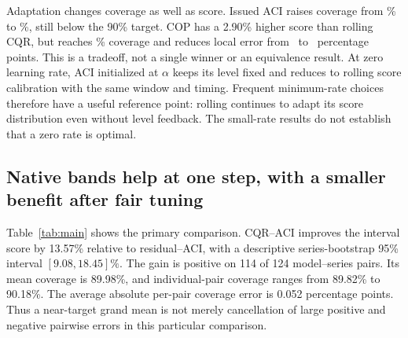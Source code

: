 \documentclass[preprint,11pt]{elsarticle}
\newcommand{\IS}{\operatorname{IS}}
\begin{document}
\begin{table}[!htbp]\centering\scriptsize
\caption{Direct comparisons with rolling CQR at $h=24$, traffic/exchange rates.
Gain is the mean of $100(1-\IS_A/\IS_{\rm rolling})$ within each matched pair; positive
is better. Coverage is percent; Local is absolute 150-origin coverage error in
percentage points. Deltas subtract rolling values. ACI uses the wide grid.
Wins are descriptive signs, not independent significant replications.}
\label{tab:rolling}
\end{table}

Adaptation changes coverage as well as score. Issued ACI raises coverage from
\RollingCoverage\% to \IssuedCoverage\%, still below the 90\% target. COP has a
2.90\% higher score than rolling CQR, but reaches \COPCoverage\% coverage and reduces
local error from \RollingLocal\ to \COPLocal\ percentage points. This is a tradeoff,
not a single winner or an equivalence result. At zero learning rate, ACI initialized
at $\alpha$ keeps its level fixed and reduces to rolling score calibration with the
same window and timing. Frequent minimum-rate choices therefore have a useful
reference point: rolling continues to adapt its score distribution even without
level feedback. The small-rate results do not establish that a zero rate is optimal.

\subsection{Native bands help at one step, with a smaller benefit after fair tuning}
Table~\ref{tab:main} shows the primary comparison. CQR--ACI improves the interval score
by 13.57\% relative to residual--ACI, with a descriptive series-bootstrap 95\% interval
$[9.08,18.45]\%$. The gain is positive on 114 of 124 model--series pairs. Its mean
coverage is 89.98\%, and individual-pair coverage ranges from 89.82\% to 90.18\%.
The average absolute per-pair coverage error is 0.052 percentage points. Thus a near-target
grand mean is not merely cancellation of large positive and negative pairwise errors in
this particular comparison.

\begin{table}[htbp]\centering\small
\caption{Main panel at a 90\% target. Gain is relative to default residual--ACI.
Gap is the mean absolute pairwise coverage error; Local is the mean 150-origin coverage
error. FACI, SAOCP, SF-OGD and PI-log refer to the declared adaptations.}
\label{tab:main}
\end{table}
\end{document}
